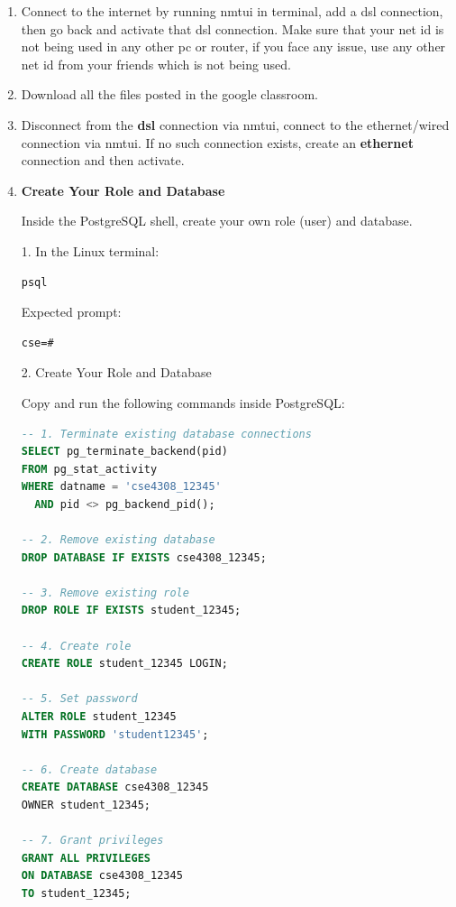 \documentclass[12pt,a4paper]{article}
\begin{document}
\begin{enumerate}
\item Connect to the internet by running nmtui in terminal, add a dsl connection, then go back and activate that dsl connection. Make sure that your net id is not being used in any other pc or router, if you face any issue, use any other net id from your friends which is not being used.

\item Download all the files posted in the google classroom.

\item Disconnect from the \textbf{dsl} connection via nmtui, connect to the ethernet/wired connection via nmtui. If no such connection exists, create an \textbf{ethernet} connection  and then activate.

    \item \textbf{Create Your Role and Database}

Inside the PostgreSQL shell, create your own role (user) and database.

1. In the Linux terminal:
\begin{lstlisting}[language=bash]
psql
\end{lstlisting}

Expected prompt:
\begin{lstlisting}
cse=#
\end{lstlisting}

2. Create Your Role and Database

Copy and run the following commands inside PostgreSQL:
\begin{lstlisting}[language=SQL]
-- 1. Terminate existing database connections
SELECT pg_terminate_backend(pid)
FROM pg_stat_activity
WHERE datname = 'cse4308_12345'
  AND pid <> pg_backend_pid();

-- 2. Remove existing database
DROP DATABASE IF EXISTS cse4308_12345;

-- 3. Remove existing role
DROP ROLE IF EXISTS student_12345;

-- 4. Create role
CREATE ROLE student_12345 LOGIN;

-- 5. Set password
ALTER ROLE student_12345
WITH PASSWORD 'student12345';

-- 6. Create database
CREATE DATABASE cse4308_12345
OWNER student_12345;

-- 7. Grant privileges
GRANT ALL PRIVILEGES
ON DATABASE cse4308_12345
TO student_12345;
\end{lstlisting}


\end{enumerate}
\end{document}
